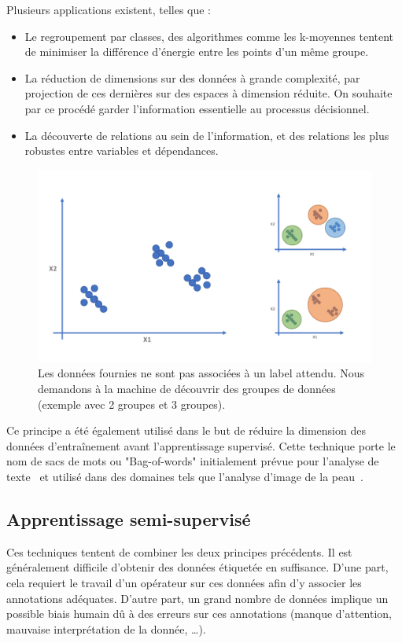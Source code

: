 Plusieurs applications existent, telles que :
\begin{itemize}
	\item Le regroupement par classes, des algorithmes comme les k-moyennes tentent de minimiser la différence d’énergie entre les points d’un même groupe.
	\item La réduction de dimensions sur des données à grande complexité, par projection de ces dernières sur des espaces à dimension réduite. On souhaite par ce procédé garder l’information essentielle au processus décisionnel.
	\item La découverte de relations au sein de l’information, et des relations les plus robustes entre variables et dépendances.
\end{itemize}\par
 
\begin{figure}[H]
    \centering
    \includegraphics[width=0.8\linewidth]{contents/chapter_3/resources/scheme_unsupervised.pdf}
    \caption{Les données fournies ne sont pas associées à un label attendu. Nous demandons à la machine de découvrir des groupes de données (exemple avec 2 groupes et 3 groupes).}
    \label{fig:scheme_unsupervised}
\end{figure}

Ce principe a été également utilisé dans le but de réduire la dimension des données d'entraînement avant l'apprentissage supervisé. Cette technique porte le nom de sacs de mots ou "Bag-of-words" initialement prévue pour l'analyse de texte~\cite{Zhang2010} et utilisé dans des domaines tels que l'analyse d'image de la peau~\cite{Situ2008}.\par

\subsection{Apprentissage semi-supervisé}
Ces techniques tentent de combiner les deux principes précédents. Il est généralement difficile d’obtenir des données étiquetée en suffisance. D’une part, cela requiert le travail d’un opérateur sur ces données afin d’y associer les annotations adéquates. D’autre part, un grand nombre de données implique un possible biais humain dû à des erreurs sur ces annotations (manque d’attention, mauvaise interprétation de la donnée, …).\par

